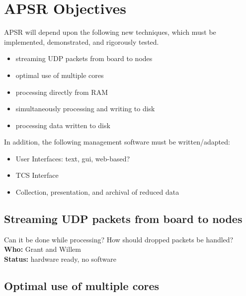 \chapter{APSR Objectives}
\label{app:dada_todo}

APSR will depend upon the following new techniques, which must be
implemented, demonstrated, and rigorously tested.

\begin{itemize}

\item streaming UDP packets from board to nodes

\item optimal use of multiple cores

\item processing directly from RAM 

\item simultaneously processing and writing to disk

\item processing data written to disk \\

\end{itemize}

\noindent
In addition, the following management software must be written/adapted:

\begin{itemize}

\item User Interfaces: text, gui, web-based?

\item TCS Interface

\item Collection, presentation, and archival of reduced data

\end{itemize}
\section{Streaming UDP packets from board to nodes}

Can it be done while processing? How should dropped packets be handled? \\
{\bf Who:} Grant and Willem \\
{\bf Status:} hardware ready, no software

\section{Optimal use of multiple cores}

